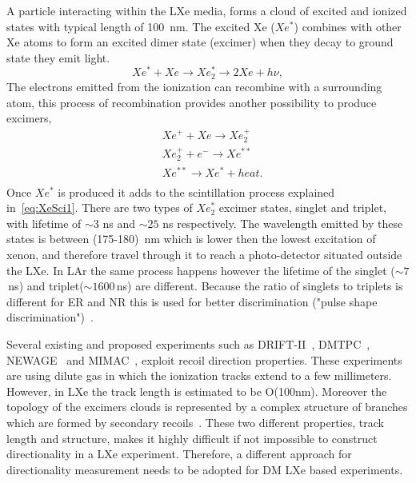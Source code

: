 A particle interacting within the LXe media, forms a cloud of excited and ionized states with typical length of 100~nm. 
The excited Xe ($Xe^*$) combines with other Xe atoms to form an excited dimer state (excimer) when they decay to ground state they emit light. 
\begin{equation} \label{eq:XeSci1}
 Xe^*+Xe \rightarrow Xe^*_2 \rightarrow 2Xe + h \nu , 
\end{equation}
The electrons emitted from the ionization can recombine with a surrounding atom, this process of recombination provides another possibility to produce excimers,
\begin{equation} \label{eq:XeSci2}
\begin{split}
  &Xe^{+} + Xe \rightarrow Xe^{+}_2 \\
  &Xe^{+}_2 + e^{-}  \rightarrow Xe^{**} \\
  &Xe^{**}   \rightarrow Xe^* + heat .\\
  \end{split}
\end{equation}  
Once $Xe^*$ is produced it adds to the scintillation process explained in~\ref{eq:XeSci1}. There are two types of $Xe^*_2$ excimer states, 
singlet and triplet, with lifetime of $\sim3$ ns and $\sim25$ ns respectively. The wavelength emitted by these states is between (175-180)~nm 
which is lower then the lowest excitation of xenon, and therefore travel through it to reach a photo-detector situated outside the LXe. In LAr the same process happens however the lifetime of the singlet ($\sim7$\,ns) and triplet($\sim1600$\,ns) are different. Because the ratio of singlets to triplets is different for ER and NR this is used for better discrimination ("pulse shape discrimination")~\cite{Lippincott:2008ad}.

Several existing and proposed experiments such as DRIFT-II~\cite{Muna:2007zz}, DMTPC~\cite{Deaconu:2017vam}, NEWAGE~\cite{Yakabe:2016pjh} and MIMAC~\cite{Riffard:2016mgw}, exploit recoil direction properties. These experiments are using dilute gas in which the ionization tracks extend to a few millimeters. However, in LXe the track length is estimated to be O(100nm). Moreover the topology of the excimers clouds is represented by a complex structure of branches which are formed by secondary recoils~\cite{Chepel:2012sj}. These two different properties, track length and structure, makes it highly difficult if not impossible to construct directionality in a LXe experiment. Therefore, a different approach for directionality measurement needs to be adopted for DM LXe based experiments.

